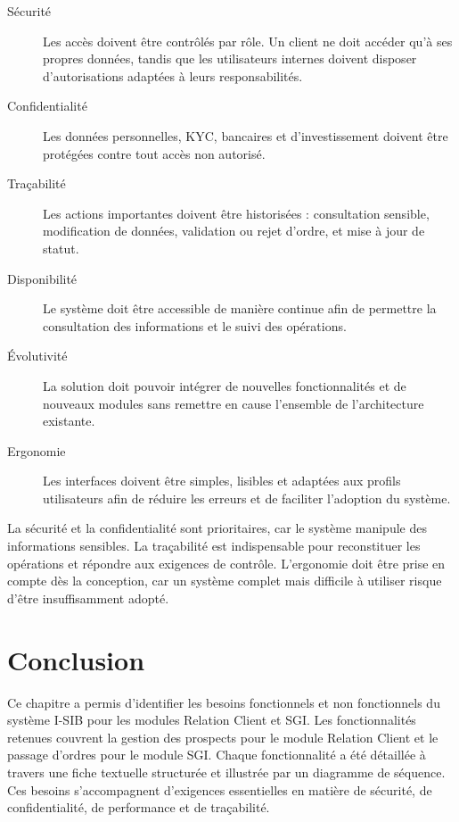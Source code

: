 \documentclass[a4paper,12pt]{report}
\begin{document}
\begin{description}
    \item[Sécurité] Les accès doivent être contrôlés par rôle. Un client ne doit accéder
          qu'à ses propres données, tandis que les utilisateurs internes doivent disposer
          d'autorisations adaptées à leurs responsabilités.

    \item[Confidentialité] Les données personnelles, KYC, bancaires et d'investissement
          doivent être protégées contre tout accès non autorisé.

    \item[Traçabilité] Les actions importantes doivent être historisées : consultation
          sensible, modification de données, validation ou rejet d'ordre, et mise à jour
          de statut.

    \item[Disponibilité] Le système doit être accessible de manière continue afin de
          permettre la consultation des informations et le suivi des opérations.

    \item[Évolutivité] La solution doit pouvoir intégrer de nouvelles fonctionnalités et
          de nouveaux modules sans remettre en cause l'ensemble de l'architecture existante.

    \item[Ergonomie] Les interfaces doivent être simples, lisibles et adaptées aux profils
          utilisateurs afin de réduire les erreurs et de faciliter l'adoption du système.
\end{description}

La sécurité et la confidentialité sont prioritaires, car le système manipule des
informations sensibles. La traçabilité est indispensable pour reconstituer les opérations
et répondre aux exigences de contrôle. L'ergonomie doit être prise en compte dès la
conception, car un système complet mais difficile à utiliser risque d'être insuffisamment
adopté.

\section*{Conclusion}
{}

Ce chapitre a permis d'identifier les besoins fonctionnels et non fonctionnels du système
I-SIB pour les modules Relation Client et SGI. Les fonctionnalités retenues couvrent la
gestion des prospects pour le module Relation Client et le passage d'ordres pour le module
SGI. Chaque fonctionnalité a été détaillée à travers une fiche textuelle structurée et
illustrée par un diagramme de séquence. Ces besoins s'accompagnent
d'exigences essentielles en matière de sécurité, de confidentialité, de performance et de
traçabilité.
\end{document}
